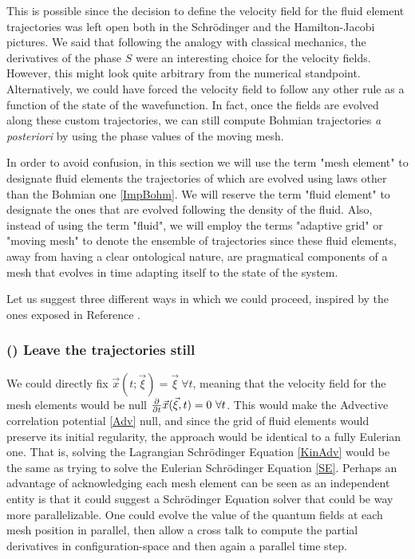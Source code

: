\documentclass[11pt, a4paper]{article} %
\begin{document}
This is possible since the decision to define the velocity field for the fluid element trajectories was left open both in the Schrödinger and the Hamilton-Jacobi pictures. We said that following the analogy with classical mechanics, the derivatives of the phase $S$ were an interesting choice for the velocity fields. However, this might look quite arbitrary from the numerical standpoint. Alternatively, we could have forced the velocity field to follow any other rule as a function of the state of the wavefunction. In fact, once the fields are evolved along these custom trajectories, we can still compute Bohmian trajectories {\em a posteriori} by using the phase values of the moving mesh.

In order to avoid confusion, in this section we will use the term "mesh element" to designate fluid elements the trajectories of which are evolved using laws other than the Bohmian one \eqref{ImpBohm}. We will reserve the term "fluid element" to designate the ones that are evolved following the density of the fluid. Also, instead of using the term "fluid", we will employ the terms "adaptive grid" or "moving mesh" to denote the ensemble of trajectories since these fluid elements, away from having a clear ontological nature, are pragmatical components of a mesh that evolves in time adapting itself to the state of the system.

Let us suggest three different ways in which we could proceed, inspired by the ones exposed in Reference \cite{Wyatt}.\vspace{-0.2cm}

\subsubsection*{\bf (\textalpha) Leave the trajectories still}\vspace{-0.2cm}
 We could directly fix $\vec{x}(t;\vec{\xi})=\vec{\xi}\ \forall t$, meaning that the velocity field for the mesh elements would be null $\pdv{}{t}\vec{x}(\vec{\xi},t)=0\ \forall t$. This would make the Advective correlation potential \eqref{Adv} null, and since the grid of fluid elements would preserve its initial regularity, the approach would be identical to a fully Eulerian one. That is, solving the Lagrangian Schrödinger Equation \eqref{KinAdv} would be the same as trying to solve the Eulerian Schrödinger Equation \eqref{SE}. Perhaps an advantage of acknowledging each mesh element can be seen as an independent entity is that it could suggest a Schrödinger Equation solver that could be way more parallelizable. One could evolve the value of the quantum fields at each mesh position in parallel, then allow a cross talk to compute the partial derivatives in configuration-space and then again a parallel time step.\vspace{-0.2cm}
\end{document}
